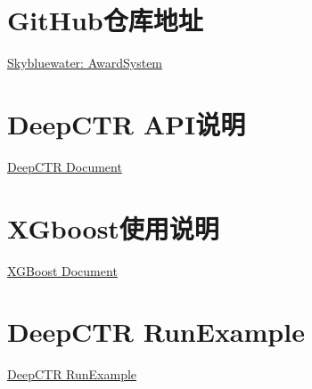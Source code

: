 %
%
%
%
%
%

\renewcommand{\thechapter}{附录}





\section{GitHub仓库地址}

\href{https://github.com/Skybluewater/AwardSystem}{Skybluewater: AwardSystem}

\section{DeepCTR API说明}

\href{https://deepctr-doc.readthedocs.io/en/latest/index.html}{DeepCTR Document}

\section{XGboost使用说明}

\href{https://xgboost.readthedocs.io/en/latest/}{XGBoost Document}

\section{DeepCTR RunExample}

\href{https://github.com/shenweichen/DeepCTR/blob/master/examples/run_estimator_pandas_classification.py}{DeepCTR RunExample}

